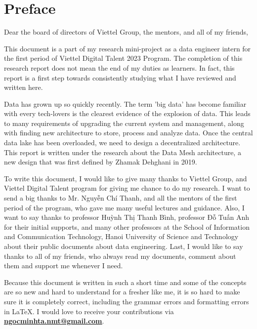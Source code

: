 \documentclass[12pt, a4paper]{book}
\begin{document}
 
	
    \raggedbottom
    \clearpage
    \thispagestyle{empty}
    
    \begingroup
    \normalsize
\chapter*{Preface}
\justifying
{}
Dear the board of directors of Viettel Group, the mentors, and all of my friends,

This document is a part of my research mini-project as a data engineer intern for the first period of Viettel Digital Talent 2023 Program. The completion of this research report does not mean the end of my duties as learners. In fact, this report is a first step towards consistently studying what I have reviewed and written here.

Data has grown up so quickly recently. The term 'big data' has become familiar with every tech-lovers is the clearest evidence of the explosion of data. This leads to many requirements of upgrading the current system and management, along with finding new architecture to store, process and analyze data. Once the central data lake has been overloaded, we need to design a decentralized architecture. This report is written under the research about the Data Mesh architecture, a new design that was first defined by Zhamak Dehghani in 2019.

To write this document, I would like to give many thanks to Viettel Group, and Viettel Digital Talent program for giving me chance to do my research. I want to send a big thanks to Mr. Nguyễn Chí Thanh, and all the mentors of the first period of the program, who gave me many useful lectures and guidance. Also, I want to say thanks to professor Huỳnh Thị Thanh Bình, professor Đỗ Tuấn Anh for their initial supports, and many other professors at the School of Information and Communication Technology, Hanoi University of Science and Technology about their public documents about data engineering. Last, I would like to say thanks to all of my friends, who always read my documents, comment about them and support me whenever I need.

Because this document is written in such a short time and some of the concepts are so new and hard to understand for a fresher like me, it is so hard to make sure it is completely correct, including the grammar errors and formatting errors in \LaTeX. I would love to receive your contributions via \underline{\textbf{\href{mailto:ngocminhta.nmt@gmail.com}{ngocminhta.nmt@gmail.com}}}.
\end{document}
